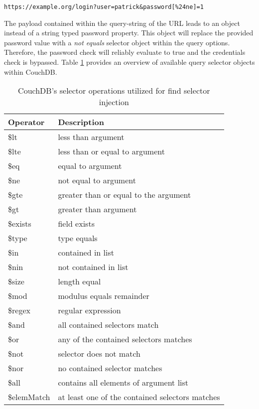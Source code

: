 \begin{lstlisting}[caption={Attack vector on CouchDB for speical key injection via the query-string parameter}, label={lst:FindSelectorInjectionAttack}]
https://example.org/login?user=patrick&password[%24ne]=1
\end{lstlisting}

The payload contained within the query-string of the URL leads to an object instead of a string typed password property. This object will replace the provided password value with a \emph{not equals} selector object within the query options. Therefore, the password check will reliably evaluate to true and the credentials check is bypassed. Table \ref{tab:couchdb_affected_selectors} provides an overview of available query selector objects within CouchDB. \\

\begin{table}[h]
 \sffamily
 \centering
 \begin{tabular}{ll}
  \textbf{Operator} & \textbf{Description} \\ \hline
  \$lt      & less than argument\\
  \$lte     & less than or equal to argument \\
  \$eq      & equal to argument \\
  \$ne      & not equal to argument \\
  \$gte     & greater than or equal to the argument \\
  \$gt      & greater than argument \\
  \$exists  & field exists \\
  \$type    & type equals \\
  \$in      & contained in list \\
  \$nin     & not contained in list \\
  \$size    & length equal \\
  \$mod     & modulus equals remainder \\
  \$regex   & regular expression \\
  \$and     & all contained selectors match \\
  \$or      & any of the contained selectors matches \\
  \$not     & selector does not match \\
  \$nor     & no contained selector matches \\
  \$all     & contains all elements of argument list \\ 
  \$elemMatch & at least one of the contained selectors matches \\
  \bottomrule 
 \end{tabular}
 \caption{CouchDB's selector operations utilized for find selector injection}
 \label{tab:couchdb_affected_selectors}
\end{table}

